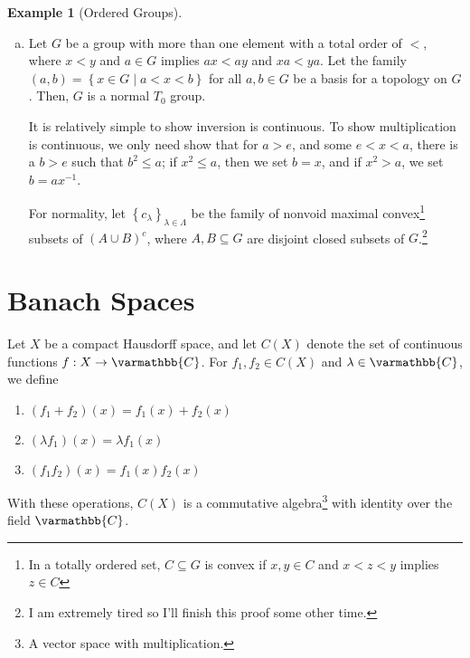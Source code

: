 \documentclass[10pt]{extarticle}
\newcommand{\C}{\mathbb{C}}
\newcommand{\set}[1]{\left\{#1\right\}}
\theoremstyle{plain}
\theoremstyle{definition}
\newtheorem*{example}{Example}
\theoremstyle{note}
\renewcommand*{\mathbb}[1]{\varmathbb{#1}}
\renewcommand{\newline}{\hfill\break}
\begin{document}
\begin{example}[Ordered Groups]
  \begin{enumerate}[(a)]
    \item Let $G$ be a group with more than one element with a total order of $<$, where $x<y$ and $a\in G$ implies $ax < ay$ and $xa < ya$. Let the family $(a,b) = \set{x\in G\mid a < x < b}$ for all $a,b\in G$ be a basis for a topology on $G$. Then, $G$ is a normal $T_0$ group.\newline

      It is relatively simple to show inversion is continuous. To show multiplication is continuous, we only need show that for $a > e$, and some $e < x < a$, there is a $b > e$ such that $b^2 \leq a$; if $x^2 \leq a$, then we set $b=x$, and if $x^2 > a$, we set $b = ax^{-1}$.\newline

      For normality, let $\set{c_{\lambda}}_{\lambda \in \Lambda}$ be the family of nonvoid maximal convex\footnote{In a totally ordered set, $C\subseteq G$ is convex if $x,y\in C$ and $x < z < y$ implies $z\in C$} subsets of $\left(A\cup B\right)^{c}$, where $A,B\subseteq G$ are disjoint closed subsets of $G$.\footnote{I am extremely tired so I'll finish this proof some other time.}%

  \end{enumerate}
\end{example}
\section{Banach Spaces}%
Let $X$ be a compact Hausdorff space, and let $C(X)$ denote the set of continuous functions $f: X\rightarrow \C$. For $f_1,f_2\in C(X)$ and $\lambda\in \C$, we define
\begin{enumerate}[(1)]
  \item $\displaystyle \left(f_1 + f_2\right)(x) = f_1(x) + f_2(x)$
  \item $\displaystyle \left(\lambda f_1\right)(x) = \lambda f_1(x)$
  \item $\displaystyle \left(f_1f_2\right)(x) = f_1(x)f_2(x)$
\end{enumerate}
With these operations, $C(X)$ is a commutative algebra\footnote{A vector space with multiplication.} with identity over the field $\C$.\newline
\end{document}
